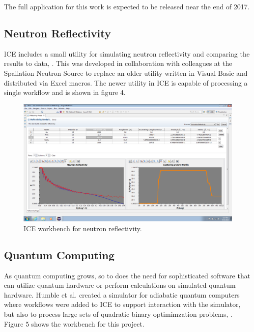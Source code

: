 The full application for this work is expected to be released near the
end of 2017.

\subsection{Neutron Reflectivity}\label{neutron-reflectivity}

ICE includes a small utility for simulating neutron reflectivity and
comparing the results to data, \cite{billings_brand_2015}. This was developed
in collaboration with colleagues at the Spallation Neutron Source to
replace an older utility written in Visual Basic and distributed via
Excel macros. The newer utility in ICE is capable of processing a single
workflow and is shown in figure 4.

\begin{figure}[htbp]
\centering
\includegraphics[width=\textwidth]{images/reflectivity-screenshot.png}
\caption{ICE workbench for neutron reflectivity.}
\end{figure}

\subsection{Quantum Computing}\label{quantum-computing}

As quantum computing grows, so to does the need for sophisticated
software that can utilize quantum hardware or perform calculations on
simulated quantum hardware. Humble et al. created a simulator for
adiabatic quantum computers where workflows were added to ICE to support
interaction with the simulator, but also to process large sets of
quadratic binary optimimzation problems, \cite{humble_integrated_2014}. Figure 5
shows the workbench for this project.

